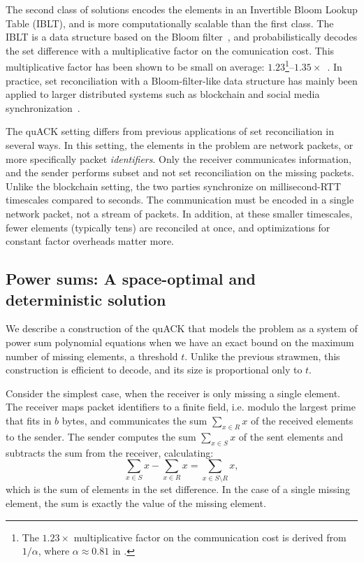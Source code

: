The second class of solutions encodes the elements in an Invertible Bloom Lookup
Table (IBLT), and is more computationally scalable than the first class. The
IBLT is a data structure based on the Bloom filter~\cite{goodrich2011invertible},
and probabilistically decodes the set difference with a multiplicative factor
on the comunication cost. This multiplicative factor has been shown to be small
on average: $1.23$\footnote{The $1.23\times$ multiplicative factor on the
communication cost is derived from $1/\alpha$, where $\alpha \approx 0.81$ in
\cite{baek2023simple}.}--$1.35\times$~\cite{yang2024practical,baek2023simple}.
In practice, set reconciliation with a Bloom-filter-like data structure has
mainly been applied to larger distributed systems such as blockchain and social
media synchronization~\cite{yang2024practical,summermatter2021byzantine}.

The quACK setting differs from previous applications of set reconciliation in
several ways. In this setting, the elements in the problem are network packets,
or more specifically packet \textit{identifiers}. Only the receiver
communicates information, and the sender performs subset and not set
reconciliation on the missing packets. Unlike the blockchain setting, the two
parties synchronize on millisecond-RTT timescales compared to seconds. The
communication must be encoded in a single network packet, not a stream of
packets. In addition, at these smaller timescales, fewer elements
(typically tens) are reconciled at once, and optimizations for constant factor
overheads matter more.

\subsection{Power sums: A space-optimal and deterministic solution}
\label{sec:quack:constructions:power-sum}

We describe a construction of the quACK that models the problem as a system of
power sum polynomial equations when we have an exact bound on the maximum
number of missing elements, a threshold $t$. Unlike the previous strawmen, this
construction is efficient to decode, and its size is proportional only to $t$.

Consider the simplest case, when the receiver is only missing a single element.
The receiver maps packet identifiers to a finite field,
i.e. modulo the largest prime that fits in $b$ bytes,
 and communicates the sum $\sum_{x \in R} x$ of the received
elements to
the sender. The sender computes the sum $\sum_{x \in S} x$ of the sent elements
and subtracts the sum from the receiver, calculating:
\[
    \sum_{x \in S} x - \sum_{x \in R} x = \sum_{x \in S\setminus R} x,
\]
which is the sum of elements in the set difference. In the case of a single
missing element, the sum is exactly the value of the missing element.

